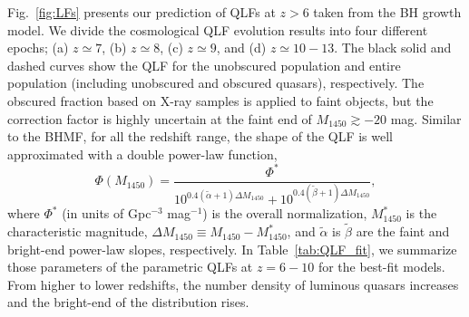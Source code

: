 \documentclass[twocolumn, twocolappendix]{aastex63}
\newcommand{\Muv}{M_{1450}}
\begin{document}
\begin{CJK*}{UTF8}{gbsn}
Fig.~\ref{fig:LFs} presents our prediction of QLFs at $z>6$ taken from the BH growth model.
We divide the cosmological QLF evolution results into four different epochs; (a) $z\simeq 7$, (b) $z\simeq 8$, (c) $z\simeq 9$, and (d) $z\simeq 10-13$.
The black solid and dashed curves show the QLF for the unobscured population 
and entire population (including unobscured and obscured quasars), respectively.
The obscured fraction based on X-ray samples \citep{2014ApJ...786..104U} is applied to faint objects, 
but the correction factor is highly uncertain at the faint end of $\Muv\gtrsim -20$ mag.
Similar to the BHMF, for all the redshift range, the shape of the QLF is well approximated with a double power-law function,
%
\begin{equation}
\Phi(\Muv) = \frac{\Phi^\ast}
{10^{0.4(\tilde \alpha+1)\Delta \Muv} + 10^{0.4(\tilde \beta+1)\Delta \Muv}},
\end{equation}
%
where $\Phi^\ast$ (in units of Gpc$^{-3}$ mag$^{-1}$) is the overall normalization, $\Muv^\ast$ is the characteristic magnitude,
$\Delta \Muv \equiv \Muv - \Muv^\ast$, and $\tilde \alpha$ is $\tilde \beta$ are the faint and bright-end power-law slopes, respectively.
In Table~\ref{tab:QLF_fit}, we summarize those parameters of the parametric QLFs at $z=6-10$ for the best-fit models.
From higher to lower redshifts, the number density of luminous quasars increases and the bright-end of the distribution rises.


\end{CJK*}
\end{document}
